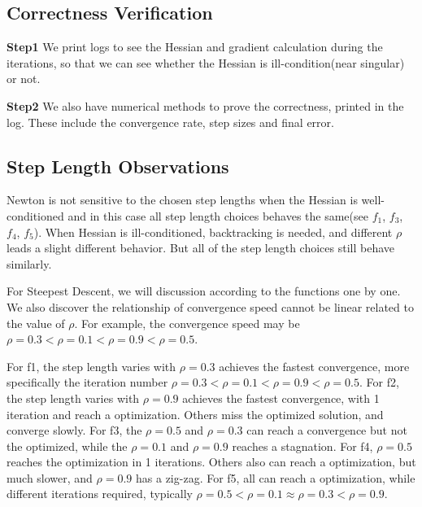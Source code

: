 \documentclass[12pt]{article}
\begin{document}
\subsection{Correctness Verification}

\textbf{Step1} We print logs to see the Hessian and gradient calculation during the iterations, so that we can see whether the Hessian is ill-condition(near singular) or not.

\textbf{Step2} We also have numerical methods to prove the correctness, printed in the log. These include the convergence rate, step sizes and final error. 


\subsection{Step Length Observations}
Newton is not sensitive to the chosen step lengths when the Hessian is well-conditioned and in this case all step length choices behaves the same(see $f_1$, $f_3$, $f_4$, $f_5$). When Hessian is ill-conditioned, backtracking is needed, and different $\rho$ leads a slight different behavior. But all of the step length choices still behave similarly.

For Steepest Descent, we will discussion according to the functions one by one. We also discover the relationship of convergence speed cannot be linear related to the value of $\rho$. For example, the convergence speed may be $\rho=0.3<\rho=0.1<\rho=0.9<\rho=0.5$.

For f1, the step length varies with $\rho=0.3$ achieves the fastest convergence, more specifically the iteration number $\rho=0.3<\rho=0.1<\rho=0.9<\rho=0.5$. 
For f2, the step length varies with $\rho=0.9$ achieves the fastest convergence, with 1 iteration and reach a optimization. Others miss the optimized solution, and converge slowly. 
For f3, the $\rho=0.5$ and $\rho=0.3$ can reach a convergence but not the optimized, while the $\rho=0.1$ and $\rho=0.9$ reaches a stagnation.
For f4, $\rho=0.5$ reaches the optimization in 1 iterations. Others also can reach a optimization, but much slower, and $\rho=0.9$ has a zig-zag.
For f5, all can reach a optimization, while different iterations required, typically $\rho=0.5 < \rho=0.1 \approx \rho=0.3 < \rho=0.9$.
\end{document}
